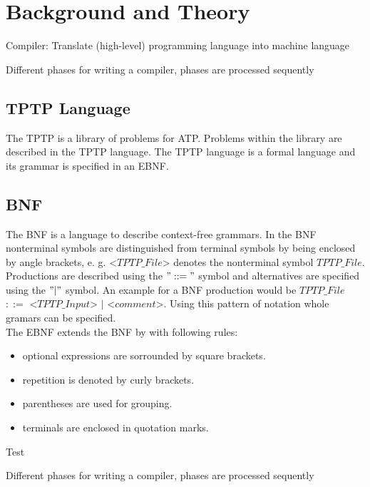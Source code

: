
\chapter{Background and Theory}\label{cha:Background}



\cite{Mogensen.2017}
Compiler: Translate (high-level) programming language into machine language

Different phases for writing a compiler, phases are processed sequently
\section{TPTP Language}\label{sec:BackgroundTPTP}
The \acf{TPTP} is a library of problems for \ac{ATP}.
Problems within the library are described in the \ac{TPTP} language.
The  \ac{TPTP} language is a formal language and its grammar is specified in an \ac{EBNF}. \cite{Sut17}\\

\section{\acf{BNF}}\label{sec:BackgroundBNF}
The  \acf{BNF} is a language to describe context-free grammars.
In the \acf{BNF} nonterminal symbols are distinguished from terminal symbols by being enclosed by  angle brackets, e. g. <$TPTP\_File$> denotes the nonterminal symbol $TPTP\_File$.
Productions are described using the $"::="$ symbol and alternatives are specified using the $"|"$ symbol.
An example for a \ac{BNF} production would be $TPTP\_File$ $::=$ <$TPTP\_Input$> $|$ <$comment$>. \cite{BNF.1964} 
Using this pattern of notation whole gramars can be specified.\\
The \ac{EBNF} extends the \ac{BNF} by with following rules:

\begin{itemize}%
	\item optional expressions are sorrounded by square brackets.
	\item repetition is denoted by curly brackets.
	\item parentheses are used for grouping.
	\item terminals are enclosed in quotation marks.
\end{itemize}
\caption{Test}
\label{itemize:BackgroundBNF}
\cite{EBNF.1977}


Different phases for writing a compiler, phases are processed sequently

